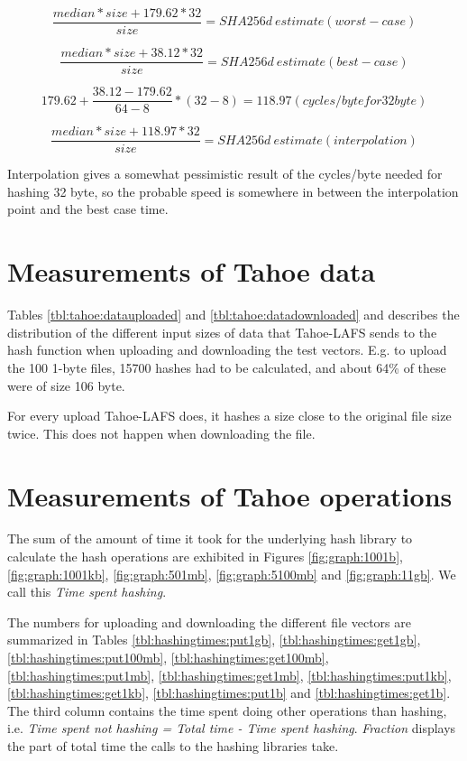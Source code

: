 \documentclass[english,12pt,a4paper]{book}
\begin{document}
$$\frac{median * size + 179.62*32}{size} = SHA256d\ estimate (worst-case)$$

$$\frac{median * size + 38.12*32}{size} = SHA256d\ estimate (best-case)$$

$$179.62 + \frac{38.12-179.62}{64-8}*(32-8) = 118.97 (cycles/byte for 32 byte)$$

$$\frac{median * size + 118.97*32}{size} = SHA256d\ estimate (interpolation)$$



Interpolation gives a somewhat pessimistic result of the cycles/byte needed for
hashing 32 byte, so the probable speed is somewhere in between the
interpolation point and the best case time.

\section{Measurements of Tahoe data}
\label{sec:results:tahoedata}

Tables \ref{tbl:tahoe:datauploaded} and \ref{tbl:tahoe:datadownloaded} and
describes the distribution of the different input sizes of data that
Tahoe-\ac{LAFS} sends to the hash function when uploading and downloading the
test vectors. E.g. to upload the 100 1-byte files, 15700 hashes had to be
calculated, and about 64\% of these were of size 106 byte.

For every upload Tahoe-\ac{LAFS} does, it hashes a size close to the original
file size twice. This does not happen when downloading the file.



\section{Measurements of Tahoe operations}
The sum of the amount of time it took for the underlying hash library to
calculate the hash operations are exhibited in Figures \ref{fig:graph:1001b},
\ref{fig:graph:1001kb}, \ref{fig:graph:501mb}, \ref{fig:graph:5100mb} and
\ref{fig:graph:11gb}. We call this \emph{Time spent hashing}.

The numbers for uploading and downloading the different file vectors are
summarized in Tables \ref{tbl:hashingtimes:put1gb},
\ref{tbl:hashingtimes:get1gb}, \ref{tbl:hashingtimes:put100mb},
\ref{tbl:hashingtimes:get100mb}, \ref{tbl:hashingtimes:put1mb},
\ref{tbl:hashingtimes:get1mb}, \ref{tbl:hashingtimes:put1kb},
\ref{tbl:hashingtimes:get1kb}, \ref{tbl:hashingtimes:put1b} and
\ref{tbl:hashingtimes:get1b}.  The third column contains the time spent doing
other operations than hashing, i.e. \emph{Time spent not hashing = Total time -
Time spent hashing}. \emph{Fraction} displays the part of total time the calls
to the hashing libraries take.
\end{document}
